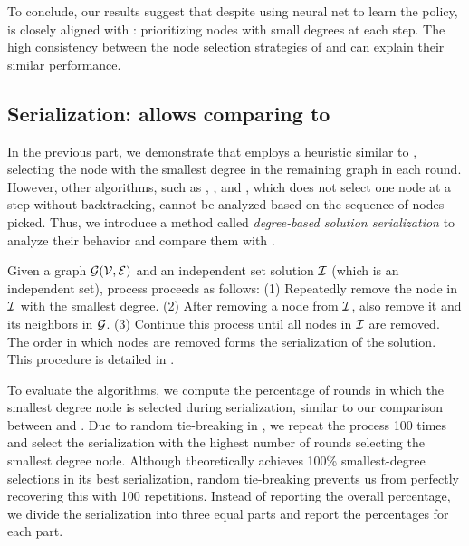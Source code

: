 To conclude, our results suggest that despite using neural net to learn the policy,   \gflownets is closely aligned with \deggreedy: prioritizing nodes with small degrees at each step. The high consistency between the node selection strategies of \gflownets and \deggreedy can explain their similar performance.  


\subsection{Serialization: allows comparing to \deggreedy}\label{sec:comp-other-algs}




In the previous part, we demonstrate that \gflownets employs a heuristic similar to \deggreedy, selecting the node with the smallest degree in the remaining graph in each round. However, other algorithms, such as \redumis, \pcqo, and \difusco, which does not select one node at a step without backtracking, cannot be analyzed based on the sequence of nodes picked. Thus, we introduce a method called \emph{degree-based solution serialization} to analyze their behavior and compare them with \deggreedy.

Given a graph ${\mathcal{G}}({\mathcal{V}},{\mathcal{E}})$ and an independent set solution ${\mathcal{I}}$ (which is an independent set), process proceeds as follows: (1) Repeatedly remove the node in ${\mathcal{I}}$ with the smallest degree. (2) After removing a node from ${\mathcal{I}}$, also remove it and its neighbors in ${\mathcal{G}}$. (3) Continue this process until all nodes in ${\mathcal{I}}$ are removed.
The order in which nodes are removed forms the serialization of the solution. This procedure is detailed in .

To evaluate the algorithms, we compute the percentage of rounds in which the smallest degree node is selected during serialization, similar to our comparison between \gflownets and \deggreedy. Due to random tie-breaking in , we repeat the process 100 times and select the serialization with the highest number of rounds selecting the smallest degree node. Although \deggreedy theoretically achieves 100\% smallest-degree selections in its best serialization, random tie-breaking prevents us from perfectly recovering this with 100 repetitions. Instead of reporting the overall percentage, we divide the serialization into three equal parts and report the percentages for each part.

